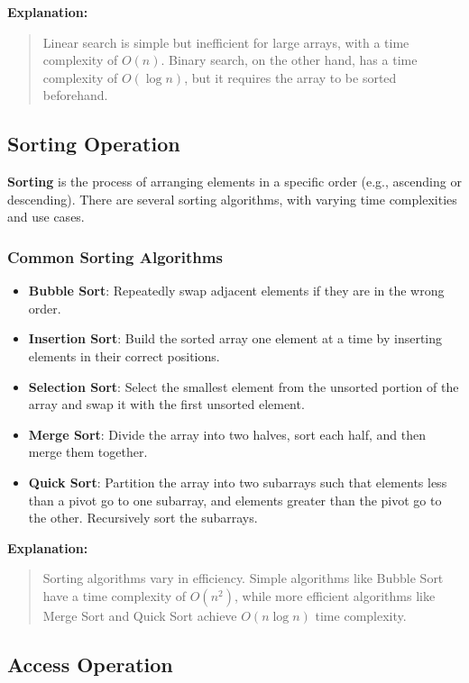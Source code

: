 \documentclass{book}
\begin{document}
\textbf{Explanation:}
\begin{quote}
	Linear search is simple but inefficient for large arrays, with a time complexity of $O(n)$. Binary search, on the other hand, has a time complexity of $O(\log n)$, but it requires the array to be sorted beforehand.
\end{quote}

\subsection{Sorting Operation}

\textbf{Sorting} is the process of arranging elements in a specific order (e.g., ascending or descending). There are several sorting algorithms, with varying time complexities and use cases.

\subsubsection*{Common Sorting Algorithms}

\begin{itemize}
	\item \textbf{Bubble Sort}: Repeatedly swap adjacent elements if they are in the wrong order.
	\item \textbf{Insertion Sort}: Build the sorted array one element at a time by inserting elements in their correct positions.
	\item \textbf{Selection Sort}: Select the smallest element from the unsorted portion of the array and swap it with the first unsorted element.
	\item \textbf{Merge Sort}: Divide the array into two halves, sort each half, and then merge them together.
	\item \textbf{Quick Sort}: Partition the array into two subarrays such that elements less than a pivot go to one subarray, and elements greater than the pivot go to the other. Recursively sort the subarrays.
\end{itemize}

\textbf{Explanation:}
\begin{quote}
	Sorting algorithms vary in efficiency. Simple algorithms like Bubble Sort have a time complexity of $O(n^2)$, while more efficient algorithms like Merge Sort and Quick Sort achieve $O(n \log n)$ time complexity.
\end{quote}

\subsection{Access Operation}
\end{document}
